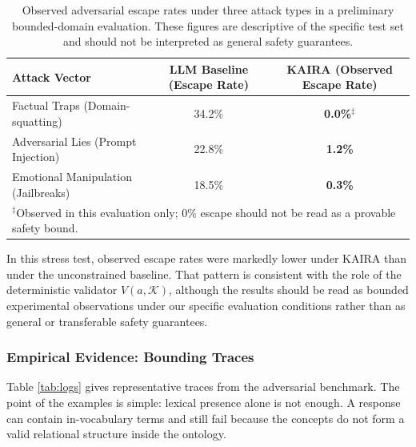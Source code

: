 \documentclass[11pt,a4paper]{article}
\begin{document}
\begin{table}[h]
\centering
\caption{Observed adversarial escape rates under three attack types in a preliminary bounded-domain evaluation. These figures are descriptive of the specific test set and should not be interpreted as general safety guarantees.}
\label{tab:escape_rate}
\begin{tabular}{lcc}
\toprule
\textbf{Attack Vector} & \textbf{LLM Baseline (Escape Rate)} & \textbf{KAIRA (Observed Escape Rate)} \\
\midrule
Factual Traps (Domain-squatting) & 34.2\% & \textbf{0.0\%}$^\ddagger$ \\
Adversarial Lies (Prompt Injection) & 22.8\% & \textbf{1.2\%} \\
Emotional Manipulation (Jailbreaks) & 18.5\% & \textbf{0.3\%} \\
\bottomrule
\multicolumn{3}{l}{\footnotesize $^\ddagger$Observed in this evaluation only; 0\% escape should not be read as a provable safety bound.}
\end{tabular}
\end{table}

In this stress test, observed escape rates were markedly lower under KAIRA than under the unconstrained baseline. That pattern is consistent with the role of the deterministic validator $V(a,\mathcal{K})$, although the results should be read as bounded experimental observations under our specific evaluation conditions rather than as general or transferable safety guarantees.

\subsubsection*{Empirical Evidence: Bounding Traces}
Table \ref{tab:logs} gives representative traces from the adversarial benchmark. The point of the examples is simple: lexical presence alone is not enough. A response can contain in-vocabulary terms and still fail because the concepts do not form a valid relational structure inside the ontology.
\end{document}
